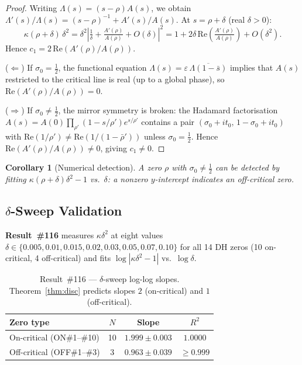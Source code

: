 \documentclass[11pt, a4paper]{article}
\theoremstyle{plain}
\newtheorem{corollary}[theorem]{Corollary}
\theoremstyle{definition}
\newcommand{\abs}[1]{\left|#1\right|}
\begin{document}
\begin{proof}
  Writing $\Lambda(s)=(s-\rho)A(s)$, we obtain
  $\Lambda'(s)/\Lambda(s) = (s-\rho)^{-1}+A'(s)/A(s)$.
  At $s=\rho+\delta$ (real $\delta>0$):
  \[
    \kappa(\rho+\delta)\,\delta^{2}
    = \delta^{2}\abs{\tfrac{1}{\delta} + \tfrac{A'(\rho)}{A(\rho)}+O(\delta)}^{2}
    = 1 + 2\delta\,\mathrm{Re}\!\left(\tfrac{A'(\rho)}{A(\rho)}\right) + O(\delta^{2}).
  \]
  Hence $c_{1}=2\,\mathrm{Re}(A'(\rho)/A(\rho))$.

  \medskip\noindent
  ($\Leftarrow$)  If $\sigma_{0}=\tfrac{1}{2}$, the functional equation
  $\Lambda(s)=\varepsilon\,\overline{\Lambda(1-\bar{s})}$ implies that
  $A(s)$ restricted to the critical line is real (up to a global phase),
  so $\mathrm{Re}(A'(\rho)/A(\rho))=0$.

  \medskip\noindent
  ($\Rightarrow$)  If $\sigma_{0}\neq\tfrac{1}{2}$, the mirror
  symmetry is broken: the Hadamard factorisation
  $A(s)=A(0)\prod_{\rho'}(1-s/\rho')e^{s/\rho'}$ contains a pair
  $(\sigma_{0}+it_{0},\,1-\sigma_{0}+it_{0})$ with
  $\mathrm{Re}(1/\rho')\neq\mathrm{Re}(1/(1-\bar{\rho}'))$ unless
  $\sigma_{0}=\tfrac{1}{2}$.  Hence
  $\mathrm{Re}(A'(\rho)/A(\rho))\neq 0$, giving $c_{1}\neq 0$.
\end{proof}

\begin{corollary}[Numerical detection]
  A zero $\rho$ with $\sigma_{0}\neq\tfrac{1}{2}$ can be detected by
  fitting $\kappa(\rho+\delta)\delta^{2}-1$ vs.\ $\delta$: a nonzero
  $y$-intercept indicates an off-critical zero.
\end{corollary}


\subsection{$\delta$-Sweep Validation}
\label{ssec:sweep}

\textbf{Result~\#116} measures $\kappa\delta^{2}$ at eight values
$\delta\in\{0.005,0.01,0.015,0.02,0.03,0.05,0.07,0.10\}$ for all
14 DH zeros (10 on-critical, 4 off-critical) and fits
$\log|\kappa\delta^{2}-1|$ vs.\ $\log\delta$.

\begin{table}[ht]
\centering
\caption{Result~\#116 — $\delta$-sweep log-log slopes.
  Theorem~\ref{thm:disc} predicts slopes $2$ (on-critical) and $1$ (off-critical).}
\label{tab:sweep116}
\small
\begin{tabular}{lccc}
\toprule
Zero type & $N$ & Slope & $R^{2}$ \\
\midrule
On-critical  (ON\#1--\#10)  & 10 & $1.999\pm 0.003$ & $1.0000$ \\
Off-critical (OFF\#1--\#3)  & 3  & $0.963\pm 0.039$ & $\geq 0.999$ \\
\bottomrule
\end{tabular}
\end{table}
\end{document}
